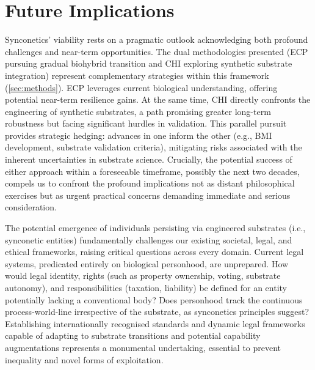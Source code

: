 \documentclass[10pt]{article}
\begin{document}
\begin{sloppypar}

  \section{Future Implications}
  \label{sec:implications}

  Synconetics’ viability rests on a pragmatic outlook acknowledging both profound challenges and near-term opportunities. The dual methodologies presented (ECP pursuing gradual biohybrid transition and CHI exploring synthetic substrate integration) represent complementary strategies within this framework (\autoref{sec:methods}). ECP leverages current biological understanding, offering potential near-term resilience gains. At the same time, CHI directly confronts the engineering of synthetic substrates, a path promising greater long-term robustness but facing significant hurdles in validation. This parallel pursuit provides strategic hedging: advances in one inform the other (e.g., BMI development, substrate validation criteria), mitigating risks associated with the inherent uncertainties in substrate science. Crucially, the potential success of either approach within a foreseeable timeframe, possibly the next two decades, compels us to confront the profound implications not as distant philosophical exercises but as urgent practical concerns demanding immediate and serious consideration.

  The potential emergence of individuals persisting via engineered substrates (i.e., synconetic entities) fundamentally challenges our existing societal, legal, and ethical frameworks, raising critical questions across every domain. Current legal systems, predicated entirely on biological personhood, are unprepared. How would legal identity, rights (such as property ownership, voting, substrate autonomy), and responsibilities (taxation, liability) be defined for an entity potentially lacking a conventional body? Does personhood track the continuous process-world-line irrespective of the substrate, as synconetics principles suggest? Establishing internationally recognised standards and dynamic legal frameworks capable of adapting to substrate transitions and potential capability augmentations represents a monumental undertaking, essential to prevent inequality and novel forms of exploitation.


\end{sloppypar}
\end{document}
